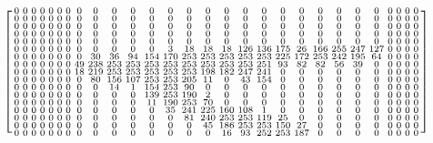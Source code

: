 \documentclass[titlepage,UTF8,zihao=-4]{ctexart}
\begin{document}
\begin{figure}
    \begin{equation*}
    \begin{bmatrix}
    \addtocounter{MaxMatrixCols}{28}
    \begin{smallmatrix}
    0& 0& 0& 0& 0& 0& 0& 0& 0& 0& 0& 0& 0& 0& 0& 0& 0& 0& 0& 0& 0& 0& 0& 0& 0& 0& 0& 0 \\
    0& 0& 0& 0& 0& 0& 0& 0& 0& 0& 0& 0& 0& 0& 0& 0& 0& 0& 0& 0& 0& 0& 0& 0& 0& 0& 0& 0 \\
    0& 0& 0& 0& 0& 0& 0& 0& 0& 0& 0& 0& 0& 0& 0& 0& 0& 0& 0& 0& 0& 0& 0& 0& 0& 0& 0& 0 \\
    0& 0& 0& 0& 0& 0& 0& 0& 0& 0& 0& 0& 0& 0& 0& 0& 0& 0& 0& 0& 0& 0& 0& 0& 0& 0& 0& 0 \\
    0& 0& 0& 0& 0& 0& 0& 0& 0& 0& 0& 0& 0& 0& 0& 0& 0& 0& 0& 0& 0& 0& 0& 0& 0& 0& 0& 0 \\
    0& 0& 0& 0& 0& 0& 0& 0& 0& 0& 0& 0& 3& 18& 18& 18& 126& 136& 175& 26& 166& 255& 247& 127& 0& 0& 0& 0 \\
    0& 0& 0& 0& 0& 0& 0& 0& 30& 36& 94& 154& 170& 253& 253& 253& 253& 253& 225& 172& 253& 242& 195& 64& 0& 0& 0& 0 \\
    0& 0& 0& 0& 0& 0& 0& 49& 238& 253& 253& 253& 253& 253& 253& 253& 253& 251& 93& 82& 82& 56& 39& 0& 0& 0& 0& 0 \\
    0& 0& 0& 0& 0& 0& 0& 18& 219& 253& 253& 253& 253& 253& 198& 182& 247& 241& 0& 0& 0& 0& 0& 0& 0& 0& 0& 0 \\
    0& 0& 0& 0& 0& 0& 0& 0& 80& 156& 107& 253& 253& 205& 11& 0& 43& 154& 0& 0& 0& 0& 0& 0& 0& 0& 0& 0 \\
    0& 0& 0& 0& 0& 0& 0& 0& 0& 14& 1& 154& 253& 90& 0& 0& 0& 0& 0& 0& 0& 0& 0& 0& 0& 0& 0& 0 \\
    0& 0& 0& 0& 0& 0& 0& 0& 0& 0& 0& 139& 253& 190& 2& 0& 0& 0& 0& 0& 0& 0& 0& 0& 0& 0& 0& 0 \\
    0& 0& 0& 0& 0& 0& 0& 0& 0& 0& 0& 11& 190& 253& 70& 0& 0& 0& 0& 0& 0& 0& 0& 0& 0& 0& 0& 0 \\
    0& 0& 0& 0& 0& 0& 0& 0& 0& 0& 0& 0& 35& 241& 225& 160& 108& 1& 0& 0& 0& 0& 0& 0& 0& 0& 0& 0 \\
    0& 0& 0& 0& 0& 0& 0& 0& 0& 0& 0& 0& 0& 81& 240& 253& 253& 119& 25& 0& 0& 0& 0& 0& 0& 0& 0& 0 \\
    0& 0& 0& 0& 0& 0& 0& 0& 0& 0& 0& 0& 0& 0& 45& 186& 253& 253& 150& 27& 0& 0& 0& 0& 0& 0& 0& 0 \\
    0& 0& 0& 0& 0& 0& 0& 0& 0& 0& 0& 0& 0& 0& 0& 16& 93& 252& 253& 187& 0& 0& 0& 0& 0& 0& 0& 0 \\

\end{smallmatrix}
\end{bmatrix}
\end{equation*}
\end{figure}
\end{document}
